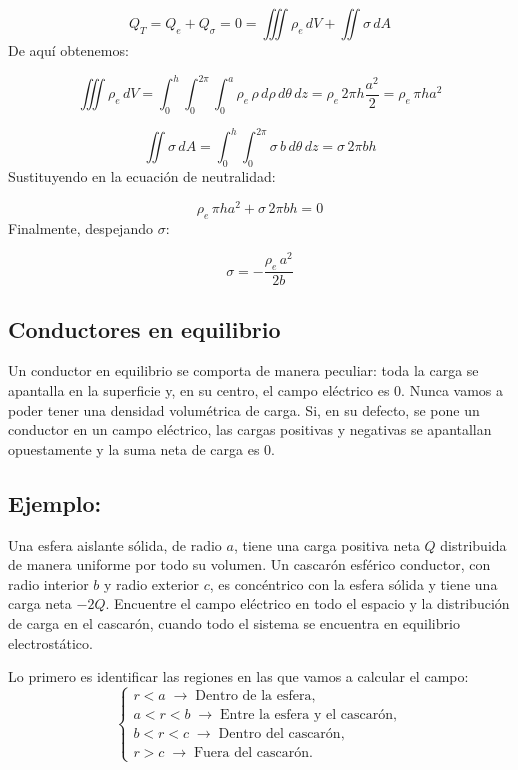 \documentclass[a4paper,12pt]{article}
\begin{document}
\[
Q_T = Q_e + Q_\sigma = 0 = \iiint \rho_e\, dV + \iint \sigma\, dA
\]
De aquí obtenemos:

\[
\iiint \rho_e\, dV = \int_0^h \int_0^{2\pi} \int_0^a \rho_e\, \rho\, d\rho\, d\theta\, dz 
= \rho_e\, 2\pi h \frac{a^{2}}{2} = \rho_e\, \pi h a^{2}
\]

\[
\iint \sigma\, dA = \int_0^h \int_0^{2\pi} \sigma\, b\, d\theta\, dz = \sigma\, 2\pi b h
\]
Sustituyendo en la ecuación de neutralidad:

\[
\rho_e\, \pi h a^{2} + \sigma\, 2\pi b h = 0
\]
Finalmente, despejando \(\sigma\):

\[
\sigma = -\frac{\rho_e\, a^{2}}{2b}
\]

\subsection{Conductores en equilibrio}
\noindent
Un conductor en equilibrio se comporta de manera peculiar: toda la carga se apantalla en la superficie y, en su centro, el campo eléctrico es \(0\). Nunca vamos a poder tener una densidad volumétrica de carga. Si, en su defecto, se pone un conductor en un campo eléctrico, las cargas positivas y negativas se apantallan opuestamente y la suma neta de carga es \(0\).

\subsection*{Ejemplo:}
\noindent
Una esfera aislante sólida, de radio \(a\), tiene una carga positiva neta \(Q\) distribuida de manera uniforme por todo su volumen.
Un cascarón esférico conductor, con radio interior \(b\) y radio exterior \(c\), es concéntrico con la esfera sólida y tiene una carga neta \(-2Q\).
Encuentre el campo eléctrico en todo el espacio y la distribución de carga en el cascarón, cuando todo el sistema se encuentra en equilibrio electrostático.

\medskip
\noindent
Lo primero es identificar las regiones en las que vamos a calcular el campo:
\[
\left\{
\begin{array}{l}
r<a \;\rightarrow\; \text{Dentro de la esfera},\\
a<r<b \;\rightarrow\; \text{Entre la esfera y el cascarón},\\
b<r<c \;\rightarrow\; \text{Dentro del cascarón},\\
r>c \;\rightarrow\; \text{Fuera del cascarón}.
\end{array}
\right.
\]
\end{document}
